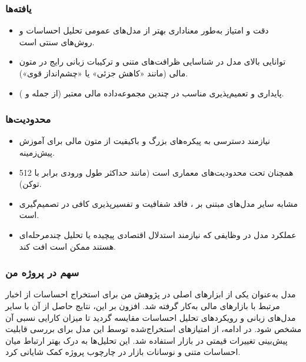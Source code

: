 \documentclass[12pt, a4paper]{report}
\begin{document}
\subsubsection{یافته‌ها}
\begin{itemize}
    \item دقت و امتیاز  به‌طور معناداری بهتر از مدل‌های عمومی تحلیل احساسات و روش‌های سنتی است.  
    \item توانایی بالای مدل در شناسایی ظرافت‌های متنی و ترکیبات زبانی رایج در متون مالی (مانند «کاهش جزئی» یا «چشم‌انداز قوی»).  
    \item پایداری و تعمیم‌پذیری مناسب در چندین مجموعه‌داده مالی معتبر (از جمله  و ).  
\end{itemize}

\subsubsection{محدودیت‌ها}
\begin{itemize}
    \item نیازمند دسترسی به پیکره‌های بزرگ و باکیفیت از متون مالی برای آموزش پیش‌زمینه.  
    \item همچنان تحت محدودیت‌های معماری  است (مانند حداکثر طول ورودی برابر با 512 توکن).  
    \item مشابه سایر مدل‌های مبتنی بر ، فاقد شفافیت و تفسیرپذیری کافی در تصمیم‌گیری است.  
    \item عملکرد مدل در وظایفی که نیازمند استدلال اقتصادی پیچیده یا تحلیل چندمرحله‌ای هستند ممکن است افت کند.  
\end{itemize}

\subsubsection{سهم در پروژه من}
مدل  به‌عنوان یکی از ابزارهای اصلی در پژوهش من برای استخراج احساسات از اخبار مرتبط با بازارهای مالی به‌کار گرفته شد. افزون بر این، نتایج حاصل از آن با سایر مدل‌های زبانی و رویکردهای تحلیل احساسات مقایسه گردید تا میزان کارایی نسبی آن مشخص شود. در ادامه، از امتیازهای استخراج‌شده توسط این مدل برای بررسی قابلیت پیش‌بینی تغییرات قیمتی در بازار استفاده شد. این تحلیل‌ها به درک بهتر ارتباط میان احساسات متنی و نوسانات بازار در چارچوب پروژه کمک شایانی کرد.


\subsection{ \cite{yang2023fingpt}}
\end{document}
